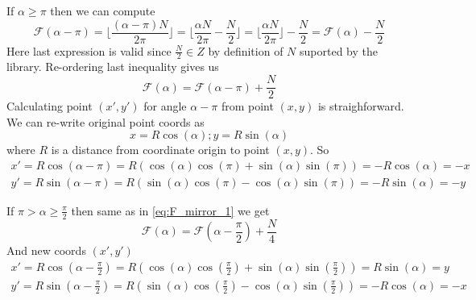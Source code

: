 \documentclass{article}
\begin{document}
If $\alpha \ge \pi$ then we can compute
\begin{equation}
\mathcal{F}(\alpha - \pi) =
\lfloor \frac{(\alpha - \pi)N}{2\pi} \rfloor =
\lfloor \frac{\alpha N}{2\pi} - \frac{N}{2} \rfloor =
\lfloor \frac{\alpha N}{2\pi} \rfloor - \frac{N}{2} =
\mathcal{F}(\alpha) - \frac{N}{2}
\end{equation}
Here last expression is valid since $\frac{N}{2} \in Z$ by definition of
$N$ suported by the library. Re-ordering last inequality gives us
\begin{equation}
\label{eq:F_mirror_1}
\mathcal{F}(\alpha) = \mathcal{F}(\alpha - \pi) + \frac{N}{2}
\end{equation}
Calculating point $(x', y')$ for angle $\alpha - \pi$ from point $(x, y)$ is
straighforward. We can re-write original point coords as
\begin{equation}
x = R\cos(\alpha); y = R\sin(\alpha)
\end{equation}
where $R$ is a distance from coordinate origin to point $(x, y)$. So
\begin{multline}
\label{eq:F_mirror_1_coords}
x' = R\cos(\alpha - \pi) = R(\cos(\alpha)\cos(\pi) + \sin(\alpha)\sin(\pi)) =
-R\cos(\alpha) = -x \\
y' = R\sin(\alpha - \pi) = R(\sin(\alpha)\cos(\pi) - \cos(\alpha)\sin(\pi)) =
-R\sin(\alpha) = -y
\end{multline}

If $\pi > \alpha \ge \frac{\pi}{2}$ then same as in \eqref{eq:F_mirror_1} we get
\begin{equation}
\label{eq:F_mirror_2}
\mathcal{F}(\alpha) = \mathcal{F}(\alpha - \frac{\pi}{2}) + \frac{N}{4}
\end{equation}
And new coords $(x', y')$
\begin{multline}
\label{eq:F_mirror_2_coords}
x' = R\cos(\alpha - \frac{\pi}{2}) = R(\cos(\alpha)\cos(\frac{\pi}{2}) + \sin(\alpha)\sin(\frac{\pi}{2})) =
R\sin(\alpha) = y \\
y' = R\sin(\alpha - \frac{\pi}{2}) = R(\sin(\alpha)\cos(\frac{\pi}{2}) - \cos(\alpha)\sin(\frac{\pi}{2})) =
-R\cos(\alpha) = -x
\end{multline}
\end{document}
